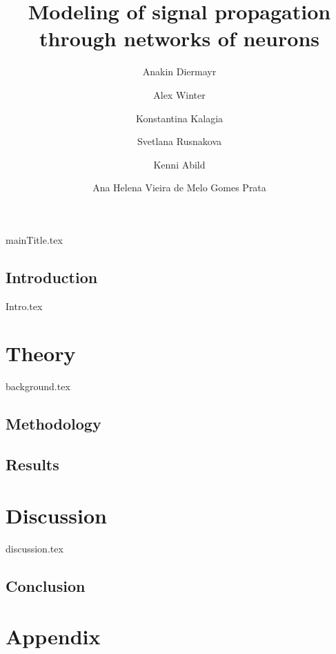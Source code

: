\documentclass[printGloss]{_NoTouch/myProject}
\title{Modeling of signal propagation through networks of neurons}
\author{ Anakin Diermayr \and  Alex Winter \and Konstantina Kalagia \and Svetlana Rusnakova \and Kenni Abild \and  Ana Helena Vieira de Melo Gomes Prata }
\begin{document}

{mainTitle.tex}
\tableofcontents

\printacronyms







\newpage
{}
\chapter*{Introduction} 
{Intro.tex}

\part{Theory}

{background.tex}

\newpage
\chapter{Methodology}

\newpage
\chapter{Results}


\newpage
\part{Discussion}
{discussion.tex}

\newpage
\chapter{Conclusion}


\appendix
\part*{Appendix}
\end{document}
